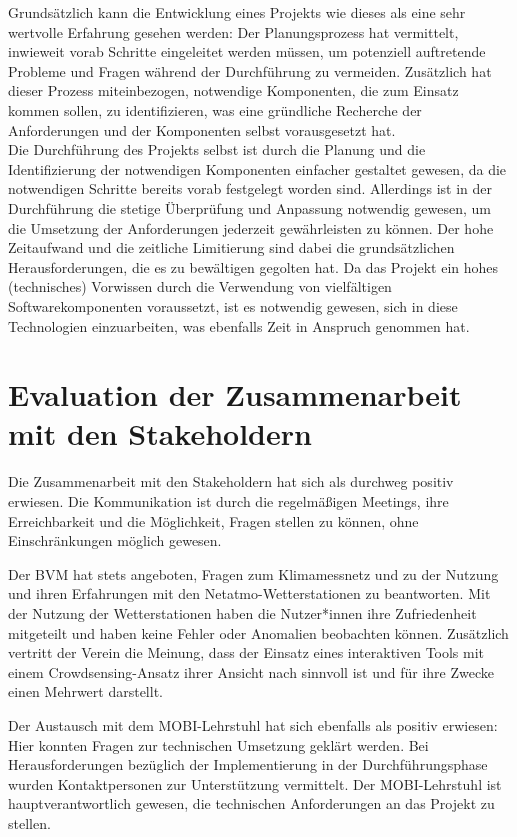 Grundsätzlich kann die Entwicklung eines Projekts wie dieses als eine sehr wertvolle Erfahrung gesehen werden: Der Planungsprozess hat vermittelt, inwieweit vorab Schritte eingeleitet werden müssen, um potenziell auftretende Probleme und Fragen während der Durchführung zu vermeiden. Zusätzlich hat dieser Prozess miteinbezogen, notwendige Komponenten, die zum Einsatz kommen sollen, zu identifizieren, was eine gründliche Recherche der Anforderungen und der Komponenten selbst vorausgesetzt hat. \\ Die Durchführung des Projekts selbst ist durch die Planung und die Identifizierung der notwendigen Komponenten einfacher gestaltet gewesen, da die notwendigen Schritte bereits vorab festgelegt worden sind. Allerdings ist in der Durchführung die stetige Überprüfung und Anpassung notwendig gewesen, um die Umsetzung der Anforderungen jederzeit gewährleisten zu können. Der hohe Zeitaufwand und die zeitliche Limitierung sind dabei die grundsätzlichen Herausforderungen, die es zu bewältigen gegolten hat. Da das Projekt ein hohes (technisches) Vorwissen durch die Verwendung von vielfältigen Softwarekomponenten voraussetzt, ist es notwendig gewesen, sich in diese Technologien einzuarbeiten, was ebenfalls Zeit in Anspruch genommen hat. 

\section{Evaluation der Zusammenarbeit mit den Stakeholdern}
\label{sec:evaluationstakeholder}
Die Zusammenarbeit mit den Stakeholdern hat sich als durchweg positiv erwiesen. Die Kommunikation ist durch die regelmäßigen Meetings, ihre Erreichbarkeit und die Möglichkeit, Fragen stellen zu können, ohne Einschränkungen möglich gewesen. 

Der \ac{BVM} hat stets angeboten, Fragen zum Klimamessnetz und zu der Nutzung und ihren Erfahrungen mit den Netatmo-Wetterstationen zu beantworten. Mit der Nutzung der Wetterstationen haben die Nutzer*innen ihre Zufriedenheit mitgeteilt und haben keine Fehler oder Anomalien beobachten können. Zusätzlich vertritt der Verein die Meinung, dass der Einsatz eines interaktiven Tools mit einem Crowdsensing-Ansatz ihrer Ansicht nach sinnvoll ist und für ihre Zwecke einen Mehrwert darstellt. 

Der Austausch mit dem \ac{MOBI}-Lehrstuhl hat sich ebenfalls als positiv erwiesen: Hier konnten Fragen zur technischen Umsetzung geklärt werden. Bei Herausforderungen bezüglich der Implementierung in der Durchführungsphase wurden Kontaktpersonen zur Unterstützung vermittelt. Der \ac{MOBI}-Lehrstuhl ist hauptverantwortlich gewesen, die technischen Anforderungen an das Projekt zu stellen.

